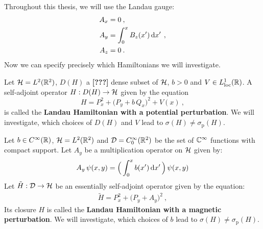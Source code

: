 Throughout this thesis, we will use the Landau gauge:
\begin{align*}
    A_x &= 0 \: , \\
    A_y &= \int_0^x B_z(x') \, \mathrm{d}x' \, \: , \\
    A_z &= 0 \: .
\end{align*}
Now we can specify precisely which Hamiltonians we will investigate.

\begin{defn}
    \label{defn-perturb-potential}
    Let $\mathcal{H} = L^2(\mathbb{R}^2)$, $D(H)$ a \textnormal{\textbf{[???]}} dense subset of $\mathcal{H}$, $b>0$ and $V \in L^1_{\text{loc}}(\mathbb{R})$. A self-adjoint operator $H: D(H) \to \mathcal{H}$ given by the equation
    \begin{equation*}
        H
        = P^2_x
        + \big( P_y + b \, Q_x \big)^2
        + V(x)
        \: ,
    \end{equation*}
    is called the \textbf{Landau Hamiltonian with a potential perturbation}. We will investigate, which choices of $D(H)$ and $V$ lead to $\sigma(H) \neq \sigma_{\mathrm{p}}(H)$.
\end{defn}

\begin{defn}
    \label{defn-perturb-magnet}
    Let $b \in C^\infty(\mathbb{R})$, $\mathcal{H} = L^2(\mathbb{R}^2)$ and $\mathcal{D} = C^\infty_0(\mathbb{R}^2)$ be the set of $\mathbb{C}^\infty$ functions with compact support. Let $A_y$ be a multiplication operator on $\mathcal{H}$ given by:
    \begin{align*}
        A_y \, \psi(x, y) = \Big( \int_0^x b(x') \, \mathrm{d}x' \, \Big) \, \psi(x, y)
    \end{align*}
    Let $\tilde H: \mathcal{D} \to \mathcal{H}$ be an essentially self-adjoint operator given by the equation:
    \begin{align*}
        \tilde H = P^2_x + \big( P_y + A_y \big)^2 \: ,
    \end{align*}
    Its closure $H$ is called the \textbf{Landau Hamiltonian with a magnetic perturbation}. We will investigate, which choices of $b$ lead to $\sigma(H) \neq \sigma_{\mathrm{p}}(H)$.
\end{defn}


